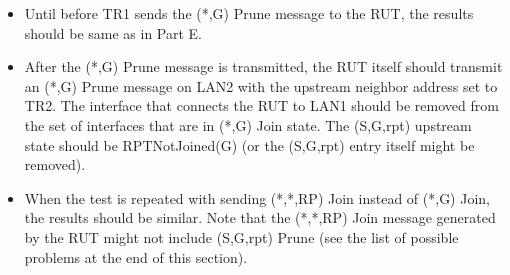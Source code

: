 \documentclass[11pt]{report}
\begin{document}

\begin{itemize}

  \item Until before TR1 sends the (*,G) Prune message to the RUT, the
  results should be same as in Part E.

  \item After the (*,G) Prune message is transmitted, the RUT itself should
  transmit an (*,G) Prune message on LAN2 with the upstream neighbor
  address set to TR2. The interface that connects the RUT to LAN1 should be
  removed from the set of interfaces that are in (*,G) Join state. The
  (S,G,rpt) upstream state should be RPTNotJoined(G) (or the (S,G,rpt) entry
  itself might be removed).

  \item When the test is repeated with sending (*,*,RP) Join instead of (*,G)
  Join, the results should be similar.
  Note that the (*,*,RP) Join message generated by the RUT might not include
  (S,G,rpt) Prune (see the list of possible problems at the end of this
  section).

\end{itemize}

\end{document}
